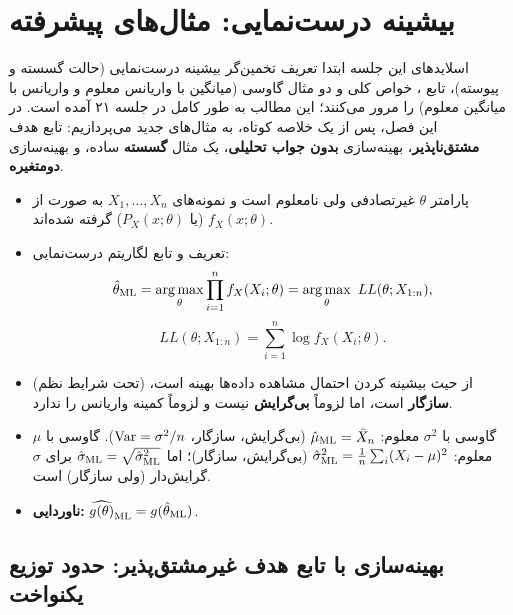 \chapter{بیشینه درست‌نمایی: مثال‌های پیشرفته}

اسلایدهای این جلسه ابتدا تعریف تخمین‌گر بیشینه درست‌نمایی (حالت گسسته و پیوسته)، تابع ، خواص کلی  و دو مثال گاوسی (میانگین با واریانس معلوم و واریانس با میانگین معلوم) را مرور می‌کنند؛ این مطالب به طور کامل در جلسه ۲۱ آمده است. در این فصل، پس از یک خلاصه کوتاه، به مثال‌های جدید می‌پردازیم: تابع هدف \textbf{مشتق‌ناپذیر}، بهینه‌سازی \textbf{بدون جواب تحلیلی}، یک مثال \textbf{گسسته} ساده، و بهینه‌سازی \textbf{دومتغیره}.

\begin{summarybox}
\begin{itemize}
\item پارامتر $\theta$ غیرتصادفی ولی نامعلوم است و نمونه‌های $X_1,\ldots,X_n$ به صورت  از $f_X(x;\theta)$ (یا $P_X(x;\theta)$) گرفته شده‌اند.
\item تعریف  و تابع لگاریتم درست‌نمایی:
\[
\hat\theta_\ML=\argmax_{\theta}\prod_{i=1}^nf_X(X_i;\theta)=\argmax_\theta\ LL(\theta;X_{1:n}),
\]
\[
LL(\theta;X_{1:n})=\sum_{i=1}^n\log f_X(X_i;\theta).
\]
\item {} از حیث بیشینه کردن احتمال مشاهده داده‌ها بهینه است، (تحت شرایط نظم) \textbf{سازگار} است، اما لزوماً \textbf{بی‌گرایش} نیست و لزوماً کمینه واریانس را ندارد.
\item گاوسی با $\sigma^2$ معلوم: $\hat\mu_{\mathrm{ML}}=\bar X_n$ (بی‌گرایش، سازگار، $\operatorname{Var}=\sigma^2/n$).\quad
گاوسی با $\mu$ معلوم: $\hat\sigma^2_{\mathrm{ML}}=\frac1n\sum_i(X_i-\mu)^2$ (بی‌گرایش، سازگار)؛ اما $\hat\sigma_{\mathrm{ML}}=\sqrt{\hat\sigma^2_{\mathrm{ML}}}$ برای $\sigma$ گرایش‌دار (ولی سازگار) است.
\item \textbf{ناوردایی:} $\widehat{g(\theta)}_{\mathrm{ML}}=g(\hat\theta_{\mathrm{ML}})$.
\end{itemize}
\end{summarybox}

\section{بهینه‌سازی با تابع هدف غیرمشتق‌پذیر: حدود توزیع یکنواخت}


